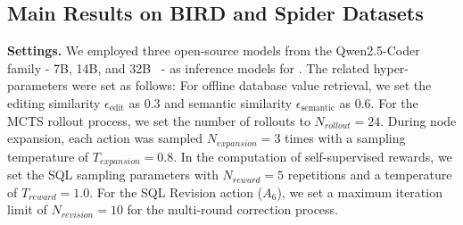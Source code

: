 \subsection{Main Results on BIRD and Spider Datasets}
\label{subsec:exp-main}



\textbf{Settings.} We employed three open-source models from the Qwen2.5-Coder family - 7B, 14B, and 32B~\cite{qwen2.5} - as inference models for \sys. 
The related hyper-parameters were set as follows: For offline database value retrieval, we set the editing similarity $\epsilon_\text{edit}$ as 0.3 and semantic similarity $\epsilon_\text{semantic}$ as 0.6. For the MCTS rollout process, we set the number of rollouts to $N_{rollout} = 24$. During node expansion, each action was sampled $N_{expansion} = 3$ times with a sampling temperature of $T_{expansion} = 0.8$. In the computation of self-supervised rewards, we set the SQL sampling parameters with $N_{reward} = 5$ repetitions and a temperature of $T_{reward} = 1.0$. For the SQL Revision action ($A_6$), we set a maximum iteration limit of $N_{revision} = 10$ for the multi-round correction process.


